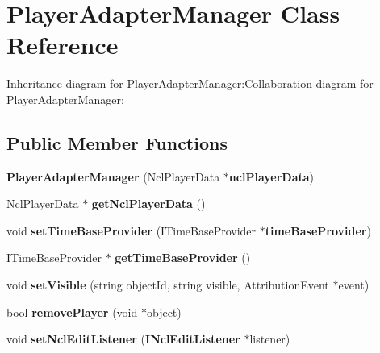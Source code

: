 \section{PlayerAdapterManager Class Reference}
\label{classbr_1_1pucrio_1_1telemidia_1_1ginga_1_1ncl_1_1adapters_1_1PlayerAdapterManager}
Inheritance diagram for PlayerAdapterManager:Collaboration diagram for PlayerAdapterManager:\subsection*{Public Member Functions}
\begin{CompactItemize}
\item 
\textbf{PlayerAdapterManager} (NclPlayerData $\ast${\bf nclPlayerData})\label{classbr_1_1pucrio_1_1telemidia_1_1ginga_1_1ncl_1_1adapters_1_1PlayerAdapterManager_7e8288306cf0bf8d2cd1cec810c3d904}

\item 
NclPlayerData $\ast$ \textbf{getNclPlayerData} ()\label{classbr_1_1pucrio_1_1telemidia_1_1ginga_1_1ncl_1_1adapters_1_1PlayerAdapterManager_288d51b5ae86eaba07d52ec0b6f7a594}

\item 
void \textbf{setTimeBaseProvider} (ITimeBaseProvider $\ast${\bf timeBaseProvider})\label{classbr_1_1pucrio_1_1telemidia_1_1ginga_1_1ncl_1_1adapters_1_1PlayerAdapterManager_5a671c0102c7b736e7e0e78e50f9922c}

\item 
ITimeBaseProvider $\ast$ \textbf{getTimeBaseProvider} ()\label{classbr_1_1pucrio_1_1telemidia_1_1ginga_1_1ncl_1_1adapters_1_1PlayerAdapterManager_51212b023936add3caef01c093f06f39}

\item 
void \textbf{setVisible} (string objectId, string visible, AttributionEvent $\ast$event)\label{classbr_1_1pucrio_1_1telemidia_1_1ginga_1_1ncl_1_1adapters_1_1PlayerAdapterManager_9614c08639e7f01b7e54a034b0f2cbed}

\item 
bool \textbf{removePlayer} (void $\ast$object)\label{classbr_1_1pucrio_1_1telemidia_1_1ginga_1_1ncl_1_1adapters_1_1PlayerAdapterManager_d04c276ab76a7bb48b11223ef5857c50}

\item 
void \textbf{setNclEditListener} ({\bf INclEditListener} $\ast$listener)\label{classbr_1_1pucrio_1_1telemidia_1_1ginga_1_1ncl_1_1adapters_1_1PlayerAdapterManager_c93507f3caf7d9f57e8dc4f55f824fe5}


\end{CompactItemize}

